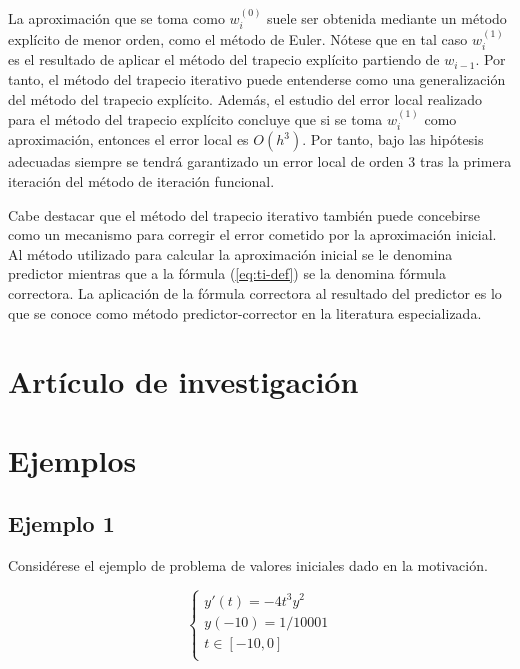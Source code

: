 \documentclass{article}
\theoremstyle{theorem-style}  %
\theoremstyle{definition-style}
\theoremstyle{example-style}
\begin{document}
	La aproximación que se toma como $w_i^{(0)}$ suele ser obtenida mediante un método explícito de menor orden, como el método de Euler. Nótese que en tal caso $w_i^{(1)}$ es el resultado de aplicar el método del trapecio explícito partiendo de $w_{i-1}$. Por tanto, el método del trapecio iterativo puede entenderse como una generalización del método del trapecio explícito. Además, el estudio del error local realizado para el método del trapecio explícito concluye que si se toma $w_i^{(1)}$ como aproximación, entonces el error local es $O(h^3)$. Por tanto, bajo las hipótesis adecuadas siempre se tendrá garantizado un error local de orden 3 tras la primera iteración del método de iteración funcional.
			
	Cabe destacar que el método del trapecio iterativo también puede concebirse como un mecanismo para corregir el error cometido por la aproximación inicial. Al método utilizado para calcular la aproximación inicial se le denomina predictor mientras que a la fórmula (\ref{eq:ti-def}) se la denomina fórmula correctora. La aplicación de la fórmula correctora al resultado del predictor es lo que se conoce como método predictor-corrector en la literatura especializada.
	
	


\section{Artículo de investigación} \label{sec:paper}

\section{Ejemplos}

\subsection{Ejemplo 1}

Considérese el ejemplo de problema de valores iniciales dado en la motivación. 

		\begin{equation*}
			\begin{cases}
			y'(t) = -4 t^3 y^2 \\
			y(-10) = 1/10001 \\
			t \in [-10,0] \\
			\end{cases}
		\end{equation*}
	
\end{document}
